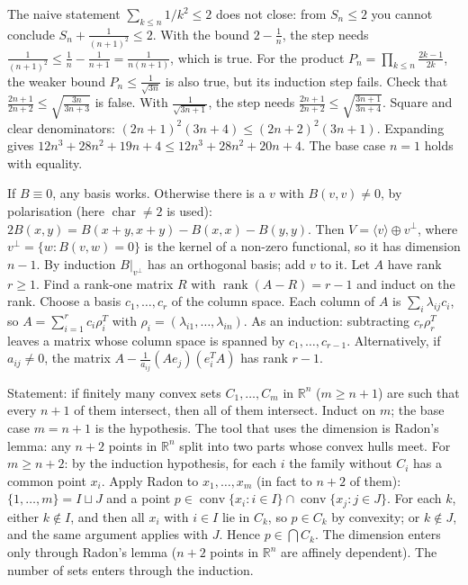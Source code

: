 \documentclass[11pt,a4paper]{article}
\begin{document}

 The naive statement $\sum_{k\le n}1/k^2\le 2$ does not close: from $S_n\le2$ you cannot conclude $S_n+\frac1{(n+1)^2}\le2$. With the bound $2-\frac1n$, the step needs $\frac1{(n+1)^2}\le\frac1n-\frac1{n+1}=\frac1{n(n+1)}$, which is true.
 For the product $P_n=\prod_{k\le n}\frac{2k-1}{2k}$, the weaker bound $P_n\le\frac1{\sqrt{3n}}$ is also true, but its induction step fails. Check that $\frac{2n+1}{2n+2}\le\sqrt{\frac{3n}{3n+3}}$ is false. With $\frac1{\sqrt{3n+1}}$, the step needs $\frac{2n+1}{2n+2}\le\sqrt{\frac{3n+1}{3n+4}}$.
 Square and clear denominators: $(2n+1)^2(3n+4)\le(2n+2)^2(3n+1)$. Expanding gives $12n^3+28n^2+19n+4\le12n^3+28n^2+20n+4$. The base case $n=1$ holds with equality.

 If $B\equiv0$, any basis works. Otherwise there is a $v$ with $B(v,v)\neq0$, by polarisation (here $\operatorname{char}\neq2$ is used): $2B(x,y)=B(x+y,x+y)-B(x,x)-B(y,y)$.
 Then $V=\langle v\rangle\oplus v^\perp$, where $v^\perp=\{w:B(v,w)=0\}$ is the kernel of a non-zero functional, so it has dimension $n-1$. By induction $B|_{v^\perp}$ has an orthogonal basis; add $v$ to it.
 Let $A$ have rank $r\geq 1$. Find a rank-one matrix $R$ with $\operatorname{rank}(A-R)=r-1$ and induct on the rank.
 Choose a basis $c_1,\dots,c_r$ of the column space. Each column of $A$ is $\sum_i\lambda_{ij}c_i$, so $A=\sum_{i=1}^r c_i\rho_i^T$ with $\rho_i=(\lambda_{i1},\dots,\lambda_{in})$. As an induction: subtracting $c_r\rho_r^T$ leaves a matrix whose column space is spanned by $c_1,\dots,c_{r-1}$. Alternatively, if $a_{ij}\neq0$, the matrix $A-\frac1{a_{ij}}(Ae_j)(e_i^TA)$ has rank $r-1$.

 Statement: if finitely many convex sets $C_1,\dots,C_m$ in $\mathbb R^n$ ($m\ge n+1$) are such that every $n+1$ of them intersect, then all of them intersect. Induct on $m$; the base case $m=n+1$ is the hypothesis. The tool that uses the dimension is Radon's lemma: any $n+2$ points in $\mathbb R^n$ split into two parts whose convex hulls meet.
 For $m\ge n+2$: by the induction hypothesis, for each $i$ the family without $C_i$ has a common point $x_i$. Apply Radon to $x_1,\dots,x_m$ (in fact to $n+2$ of them): $\{1,\dots,m\}=I\sqcup J$ and a point $p\in\operatorname{conv}\{x_i:i\in I\}\cap\operatorname{conv}\{x_j:j\in J\}$.
 For each $k$, either $k\notin I$, and then all $x_i$ with $i\in I$ lie in $C_k$, so $p\in C_k$ by convexity; or $k\notin J$, and the same argument applies with $J$. Hence $p\in\bigcap C_k$. The dimension enters only through Radon's lemma ($n+2$ points in $\mathbb R^n$ are affinely dependent). The number of sets enters through the induction.
\end{document}
